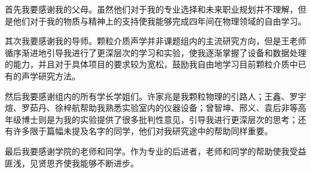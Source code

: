 
\begin{acknowledgements}
  首先我要感谢我的父母。虽然他们对于我的专业选择和未来职业规划并不理解，但是他们对于我的物质与精神上的支持使我能够完成四年间在物理领域的自由学习。
  
  其次我要感谢我的导师。颗粒介质声学并非课题组内的主流研究方向，但是王老师循序渐进地引导我进行了更深层次的学习和实验，使我逐渐掌握了设备和数据处理的能力，并且对于具体项目的要求较为宽松，鼓励我自由地学习目前颗粒介质中已有的声学研究方法。

  然后我要感谢组内的所有学长学姐们。许家兆是我颗粒物理的引路人；王鑫、罗宇煊、罗茹丹、徐梓航帮助我熟悉实验室内的仪器设备；曾智坤、邢义、袁后非等高年级博士则是为我的实验提供了很多批判性意见，引导我进行更深层次的思考；还有许多限于篇幅未提及名字的同学，他们对我研究途中的帮助同样重要。

  最后我要感谢学院的老师和同学。作为专业的后进者，老师和同学的帮助使我受益匪浅，见贤思齐使我能够不断进步。
\end{acknowledgements}
